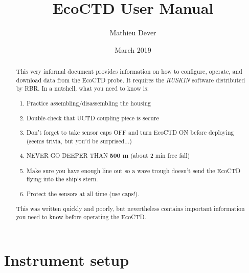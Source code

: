 \documentclass[13pt]{article}
\title{EcoCTD User Manual}
\author{Mathieu Dever}
\date{March 2019}
\newcommand{\ruskin}{\textit{RUSKIN }}
\begin{document}
\maketitle

\begin{abstract}
    This very informal document provides information on how to configure, operate, and download data from the EcoCTD probe. It requires the \ruskin software distributed by RBR. In a nutshell, what you need to know is:
    \begin{enumerate}
        \item Practice assembling/disassembling the housing
        \item Double-check that UCTD coupling piece is secure
        \item Don't forget to take sensor caps OFF and turn EcoCTD ON before deploying (seems trivia, but you'd be surprised...)
        \item NEVER GO DEEPER THAN \textbf{500 m} (about 2 min free fall)
        \item Make sure you have enough line out so a wave trough doesn't send the EcoCTD flying into the ship's stern.
        \item Protect the sensors at all time (use caps!).
    \end{enumerate}
    
    This was written quickly and poorly, but nevertheless contains important information you need to know before operating the EcoCTD.
\end{abstract}

\vfill
\hline 
\tableofcontents
\hline 

\pagebreak
\section{Instrument setup}
\end{document}
